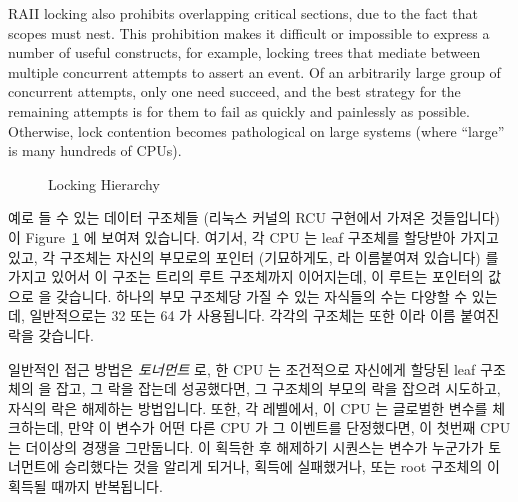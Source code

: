 RAII locking also prohibits overlapping critical sections, due to the fact
that scopes must nest.
This prohibition makes it difficult or impossible to express a number of
useful constructs, for example, locking trees
that mediate between multiple concurrent attempts to assert an event.
Of an arbitrarily large group of concurrent attempts, only one need succeed,
and the best strategy for the remaining attempts is for them to fail as
quickly and painlessly as possible.
Otherwise, lock contention becomes pathological on large systems
(where ``large'' is many hundreds of CPUs).
\fi

\begin{figure}[tb]
\begin{center}
\end{center}
\caption{Locking Hierarchy}
\label{fig:lock:Locking Hierarchy}
\end{figure}

예로 들 수 있는 데이터 구조체들 (리눅스 커널의 RCU 구현에서 가져온 것들입니다)
이 Figure~\ref{fig:lock:Locking Hierarchy} 에 보여져 있습니다.
여기서, 각 CPU 는 leaf  구조체를 할당받아 가지고 있고, 각
 구조체는 자신의 부모로의 포인터 (기묘하게도,  라
이름붙여져 있습니다) 를 가지고 있어서 이 구조는 트리의 루트 
구조체까지 이어지는데, 이 루트는  포인터의 값으로  을
갖습니다.
하나의 부모  구조체당 가질 수 있는 자식들의 수는 다양할 수 있는데,
일반적으로는 32 또는 64 가 사용됩니다.
각각의  구조체는 또한  이라 이름 붙여진 락을
갖습니다.

일반적인 접근 방법은 \emph{토너먼트} 로, 한 CPU 는 조건적으로 자신에게 할당된
leaf  구조체의  을 잡고, 그 락을 잡는데 성공했다면,
그 구조체의 부모의 락을 잡으려 시도하고, 자식의 락은 해제하는 방법입니다.
또한, 각 레벨에서, 이 CPU 는 글로벌한  변수를 체크하는데, 만약 이
변수가 어떤 다른 CPU 가 그 이벤트를 단정했다면, 이 첫번째 CPU 는 더이상의
경쟁을 그만둡니다.
이 획득한 후 해제하기 시퀀스는  변수가 누군가가 토너먼트에
승리했다는 것을 알리게 되거나,  획득에 실패했거나, 또는 root
 구조체의  이 획득될 때까지 반복됩니다.
\iffalse

